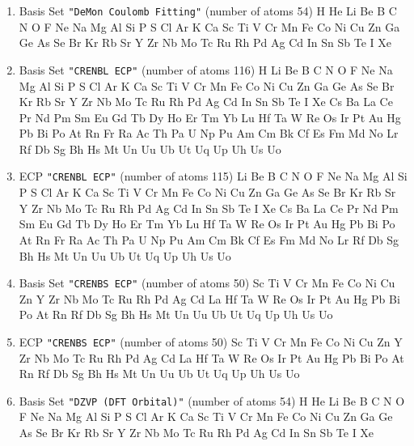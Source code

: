 \begin{enumerate}
\item Basis Set \verb#"DeMon Coulomb Fitting"# (number of atoms 54) \newline
  H He Li Be B C N O F Ne Na Mg Al Si P S Cl Ar K Ca Sc Ti V Cr Mn
 Fe Co Ni Cu Zn Ga Ge As Se Br Kr Rb Sr Y Zr Nb Mo Tc Ru Rh Pd Ag Cd In Sn
 Sb Te I Xe


\item Basis Set \verb#"CRENBL ECP"# (number of atoms 116) \newline
  H Li Be B C N O F Ne Na Mg Al Si P S Cl Ar K Ca Sc Ti V Cr Mn Fe
 Co Ni Cu Zn Ga Ge As Se Br Kr Rb Sr Y Zr Nb Mo Tc Ru Rh Pd Ag Cd In Sn Sb
 Te I Xe Cs Ba La Ce Pr Nd Pm Sm Eu Gd Tb Dy Ho Er Tm Yb Lu Hf Ta W Re Os
 Ir Pt Au Hg Pb Bi Po At Rn Fr Ra Ac Th Pa U Np Pu Am Cm Bk Cf Es Fm Md No
 Lr Rf Db Sg Bh Hs Mt Un Uu Ub Ut Uq Up Uh Us Uo


\item ECP \verb#"CRENBL ECP"# (number of atoms 115) \newline
  Li Be B C N O F Ne Na Mg Al Si P S Cl Ar K Ca Sc Ti V Cr Mn Fe Co
 Ni Cu Zn Ga Ge As Se Br Kr Rb Sr Y Zr Nb Mo Tc Ru Rh Pd Ag Cd In Sn Sb Te
 I Xe Cs Ba La Ce Pr Nd Pm Sm Eu Gd Tb Dy Ho Er Tm Yb Lu Hf Ta W Re Os Ir
 Pt Au Hg Pb Bi Po At Rn Fr Ra Ac Th Pa U Np Pu Am Cm Bk Cf Es Fm Md No Lr
 Rf Db Sg Bh Hs Mt Un Uu Ub Ut Uq Up Uh Us Uo


\item Basis Set \verb#"CRENBS ECP"# (number of atoms 50) \newline
  Sc Ti V Cr Mn Fe Co Ni Cu Zn Y Zr Nb Mo Tc Ru Rh Pd Ag Cd La Hf Ta W Re
 Os Ir Pt Au Hg Pb Bi Po At Rn Rf Db Sg Bh Hs Mt Un Uu Ub Ut Uq Up Uh Us Uo



\item ECP \verb#"CRENBS ECP"# (number of atoms 50) \newline
  Sc Ti V Cr Mn Fe Co Ni Cu Zn Y Zr Nb Mo Tc Ru Rh Pd Ag Cd La Hf Ta W Re
 Os Ir Pt Au Hg Pb Bi Po At Rn Rf Db Sg Bh Hs Mt Un Uu Ub Ut Uq Up Uh Us Uo



\item Basis Set \verb#"DZVP (DFT Orbital)"# (number of atoms 54) \newline
  H He Li Be B C N O F Ne Na Mg Al Si P S Cl Ar K Ca Sc Ti V Cr Mn
 Fe Co Ni Cu Zn Ga Ge As Se Br Kr Rb Sr Y Zr Nb Mo Tc Ru Rh Pd Ag Cd In Sn
 Sb Te I Xe
\end{enumerate}

\fussy

